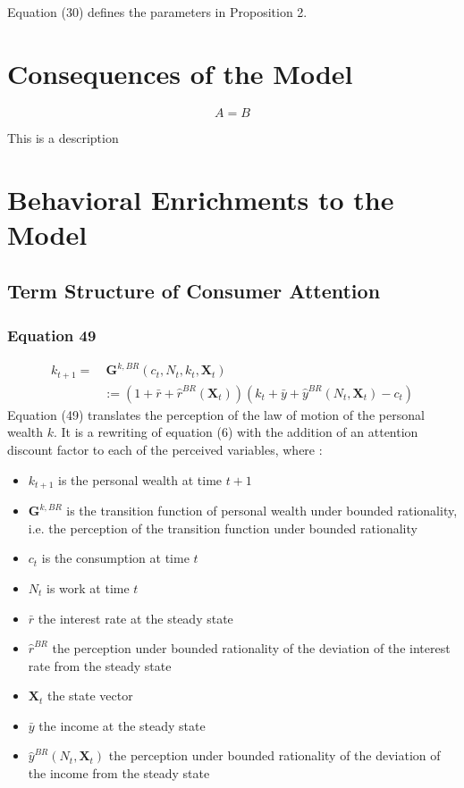 \documentclass{article}
\begin{document}
Equation (30) defines the parameters in Proposition 2.


\section{Consequences of the Model}

\begin{equation}
    A = B
\end{equation}

This is a description


\section{Behavioral Enrichments to the Model}

\subsection{Term Structure of Consumer Attention}

\subsubsection*{Equation 49}

\begin{equation} \tag{49}
    \begin{split}
        k_{t+1}= &\  \textbf{G}^{k,BR}(c_{t},N_{t},k_{t},\textbf{X}_{t}) \\
        & := (1+\bar{r}+\hat{r}^{BR}(\textbf{X}_t))(k_{t}+\bar{y}+\hat{y}^{BR}(N_{t},\textbf{X}_t)-c_{t})
    \end{split}
\end{equation}
Equation (49) translates the perception of the law of motion of the personal wealth $k$. It is a rewriting of equation (6) with the addition of an attention discount factor to each of the perceived variables, where : 
\begin{itemize}
    \item $k_{t+1}$ is the personal wealth at time $t+1$
    \item $\textbf{G}^{k,BR}$ is the transition function of personal wealth under bounded rationality, i.e. the perception of the transition function under bounded rationality
    \item $c_t$ is the consumption at time $t$
    \item $N_{t}$ is work at time $t$
    \item $\bar{r}$ the interest rate at the steady state
    \item $\hat{r}^{BR}$ the perception under bounded rationality of the deviation of the interest rate from the steady state 
    \item $\textbf{X}_t$ the state vector
    \item $\bar{y}$ the income at the steady state 
    \item $\hat{y}^{BR}(N_t,\textbf{X}_{t})$ the perception under bounded rationality of the deviation of the income from the steady state
\end{itemize}
\end{document}
